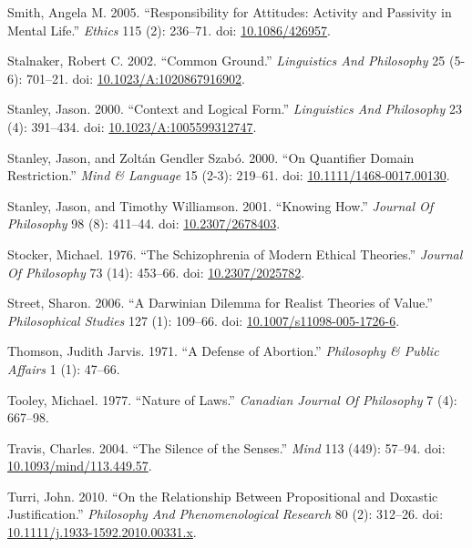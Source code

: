 \documentclass[
  10pt,
  letterpaper,
  DIV=11,
  numbers=noendperiod,
  twoside]{scrartcl}
\newlength{\cslhangindent}
\newenvironment{CSLReferences}[2] %
 {\begin{list}{}{%
  \setlength{\itemindent}{0pt}
  \setlength{\leftmargin}{0pt}
  \setlength{\parsep}{0pt}
  \ifodd #1
   \setlength{\leftmargin}{\cslhangindent}
   \setlength{\itemindent}{-1\cslhangindent}
  \fi
  \setlength{\itemsep}{#2\baselineskip}}}
 {\end{list}}
\begin{document}
\begin{CSLReferences}{1}{0}
Smith, Angela M. 2005. {``Responsibility for Attitudes: Activity and
Passivity in Mental Life.''} \emph{Ethics} 115 (2): 236--71. doi:
\href{https://doi.org/10.1086/426957}{10.1086/426957}.

Stalnaker, Robert C. 2002. {``Common Ground.''} \emph{Linguistics And
Philosophy} 25 (5-6): 701--21. doi:
\href{https://doi.org/10.1023/A:1020867916902}{10.1023/A:1020867916902}.

Stanley, Jason. 2000. {``Context and Logical Form.''} \emph{Linguistics
And Philosophy} 23 (4): 391--434. doi:
\href{https://doi.org/10.1023/A:1005599312747}{10.1023/A:1005599312747}.

Stanley, Jason, and Zoltán Gendler Szabó. 2000. {``On Quantifier Domain
Restriction.''} \emph{Mind \& Language} 15 (2-3): 219--61. doi:
\href{https://doi.org/10.1111/1468-0017.00130}{10.1111/1468-0017.00130}.

Stanley, Jason, and Timothy Williamson. 2001. {``Knowing How.''}
\emph{Journal Of Philosophy} 98 (8): 411--44. doi:
\href{https://doi.org/10.2307/2678403}{10.2307/2678403}.

Stocker, Michael. 1976. {``The Schizophrenia of Modern Ethical
Theories.''} \emph{Journal Of Philosophy} 73 (14): 453--66. doi:
\href{https://doi.org/10.2307/2025782}{10.2307/2025782}.

Street, Sharon. 2006. {``A Darwinian Dilemma for Realist Theories of
Value.''} \emph{Philosophical Studies} 127 (1): 109--66. doi:
\href{https://doi.org/10.1007/s11098-005-1726-6}{10.1007/s11098-005-1726-6}.

Thomson, Judith Jarvis. 1971. {``A Defense of Abortion.''}
\emph{Philosophy \& Public Affairs} 1 (1): 47--66.

Tooley, Michael. 1977. {``Nature of Laws.''} \emph{Canadian Journal Of
Philosophy} 7 (4): 667--98.

Travis, Charles. 2004. {``The Silence of the Senses.''} \emph{Mind} 113
(449): 57--94. doi:
\href{https://doi.org/10.1093/mind/113.449.57}{10.1093/mind/113.449.57}.

Turri, John. 2010. {``On the Relationship Between Propositional and
Doxastic Justification.''} \emph{Philosophy And Phenomenological
Research} 80 (2): 312--26. doi:
\href{https://doi.org/10.1111/j.1933-1592.2010.00331.x}{10.1111/j.1933-1592.2010.00331.x}.


\end{CSLReferences}
\end{document}

